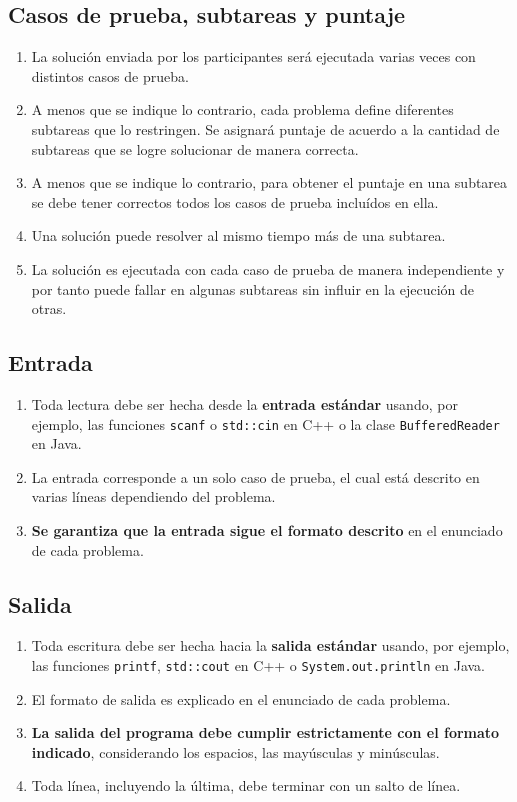 \documentclass[12pt]{oci}
\begin{document}
\subsection*{Casos de prueba, subtareas y puntaje}
\begin{enumerate}
\item La solución enviada por los participantes será ejecutada varias veces con
  distintos casos de prueba.
\item A menos que se indique lo contrario, cada problema define diferentes
  subtareas que lo restringen. Se asignará puntaje de acuerdo a la
  cantidad de subtareas que se logre solucionar de manera correcta.
\item A menos que se indique lo contrario, para obtener el puntaje en una
  subtarea se debe tener correctos todos los casos de prueba incluídos en ella.
\item Una solución puede resolver al mismo tiempo más de una subtarea.
\item La solución es ejecutada con cada caso de prueba de manera independiente y
  por tanto puede fallar en algunas subtareas sin influir en la ejecución de
  otras.
\end{enumerate}

\subsection*{Entrada}
\begin{enumerate}
\item Toda lectura debe ser hecha desde la {\bf entrada estándar} usando, por
  ejemplo, las funciones \verb+scanf+ o \verb+std::cin+ en C++ o la clase
  \verb+BufferedReader+ en Java.
\item La entrada corresponde a un solo caso de prueba, el cual está descrito en
  varias líneas dependiendo del problema.
\item {\bf Se garantiza que la entrada sigue el formato descrito} en el
  enunciado de cada problema.
\end{enumerate}

\newpage
\subsection*{Salida}
\begin{enumerate}
\item Toda escritura debe ser hecha hacia la {\bf salida estándar} usando, por
  ejemplo, las funciones \verb+printf+, \verb+std::cout+ en C++  o
  \verb+System.out.println+ en Java.
\item El formato de salida es explicado en el enunciado de cada problema.
\item {\bf La salida del programa debe cumplir estrictamente con el formato indicado},
  considerando los espacios, las mayúsculas y minúsculas.
\item Toda línea, incluyendo la última, debe terminar con un salto de línea.
\end{enumerate}
\end{document}
